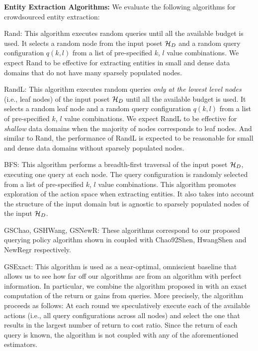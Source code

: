 \vspace{5pt}\noindent\textbf{Entity Extraction Algorithms:} We evaluate the following algorithms for crowdsourced entity extraction:
\squishlist
\item Rand: This algorithm executes random queries until all the available budget is used. It selects a random node from the input poset $\mathcal{H}_D$ and a random query configuration $q(k,l)$ from a list of pre-specified $k$, $l$ value combinations. We expect Rand to be effective for extracting entities in small and dense data domains that do not have many sparsely populated nodes.
\item RandL: This algorithm executes random queries {\em only at the lowest level nodes} (i.e., leaf nodes) of the input poset $\mathcal{H}_D$ until all the available budget is used. It selects a random leaf node and a random query configuration $q(k,l)$ from a list of pre-specified $k$, $l$ value combinations. We expect RandL to be effective for {\em shallow} data domains when the majority of nodes corresponds to leaf nodes. And similar to Rand, the performance of RandL is expected to be reasonable for small and dense data domains without sparsely populated nodes.
\item BFS: This algorithm performs a breadth-first traversal of the input poset $\mathcal{H}_D$, executing one query at each node. The query configuration is randomly selected from a list of pre-specified $k$, $l$ value combinations. This algorithm promotes exploration of the action space when extracting entities. It also takes into account the structure of the input domain but is agnostic to sparsely populated nodes of the input $\mathcal{H}_D$.
\item GSChao, GSHWang, GSNewR: These algorithms correspond to our proposed querying policy algorithm shown in  coupled with Chao92Shen, HwangShen and NewRegr respectively.
\item GSExact: This algorithm is used as a near-optimal, omniscient baseline that allows us to see how far off our algorithms are from an algorithm with perfect information. In particular, we combine the algorithm proposed in  with an exact computation of the return or gains from queries. More precisely, the algorithm proceeds as follows: At each round we speculatively execute each of the available actions (i.e., all query configurations across all nodes) and select the one that results in the largest number of return to cost ratio. Since the return of each query is known, the algorithm is not coupled with any of the aforementioned estimators.
\squishend

